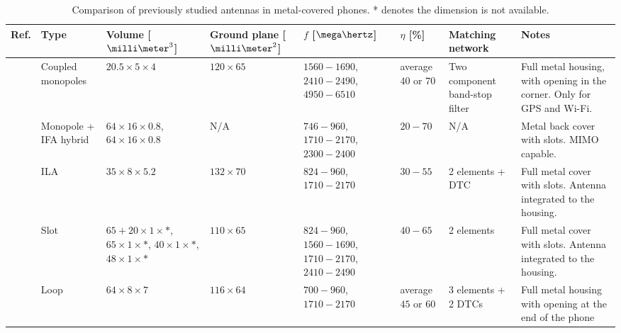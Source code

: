 \begin{table}
\centering
\caption{Comparison of previously studied antennas in metal-covered phones. * denotes the dimension is not available.}
\label{tab:metal_cover_comp}
\begin{tabular}{|M{0.03\textheight}|M{0.11\textheight}|M{0.11\textheight}|M{0.11\textheight}|M{0.1\textheight}|M{0.07\textheight}|M{0.15\textheight}|M{0.18\textheight}|}
    \hline
    \textbf{Ref.} & \textbf{Type} & \textbf{Volume [$\milli\meter^3$]} & \textbf{Ground plane [$\milli\meter^2$]} & \textbf{$f$ [$\mega\hertz$]} & \textbf{$\eta$ [\%]} & \textbf{Matching network} & \textbf{Notes}\\
    \hline
    \cite{wu_pier} & Coupled monopoles & $20.5\times5\times4$ & $120\times65$ & $1560-1690$, $2410-2490$, $4950-6510$ & average $40$ or $70$ & Two component band-stop filter & Full metal housing, with opening in the corner. Only for GPS and Wi-Fi.\\
    \hline
    \cite{son_wideband_mimo} & Monopole + IFA hybrid & $64\times16\times0.8$, $64\times16\times0.8$ & N/A & $746-960$, $1710-2170$, $2300-2400$ & $20-70$ & N/A & Metal back cover with slots. MIMO capable.\\
    \hline
    \cite{wu_tunable} & ILA & $35\times8\times5.2$ & $132\times70$ & $824-960$, $1710-2170$ & $30-55$ & 2 elements + DTC & Full metal cover with slots. Antenna integrated to the housing.\\
    \hline
    \cite{zhong_pier} & Slot & $65+20\times1\times*$, $65\times1\times*$, $40\times1\times*$, $48\times1\times*$ & $110\times65$ & $824-960$, $1560-1690$, $1710-2170$, $2410-2490$ & $40-65$ & 2 elements & Full metal cover with slots. Antenna integrated to the housing.\\
    \hline
    \cite{chen_compact_lte} & Loop & $64\times8\times7$ & $116\times64$ & $700-960$, $1710-2170$ & average $45$ or $60$ & 3 elements + 2 DTCs & Full metal housing with opening at the end of the phone\\
    \hline
\end{tabular}
\end{table}

\clearpage